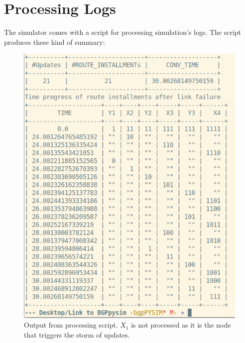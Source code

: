 \documentclass[fleqn,10pt]{SelfArx} %
\begin{document}
\section{Processing Logs}
The simulator comes with a script for processing simulation's logs. The script produces these kind of summary:
\begin{figure}[H]
\centering
\includegraphics[width=\linewidth]{figures/output.png}
\caption{Output from processing script. $X_1$ is not processed as it is the node that triggers the storm of updates.}
\label{fig:fabrex}
\end{figure}




\end{document}
